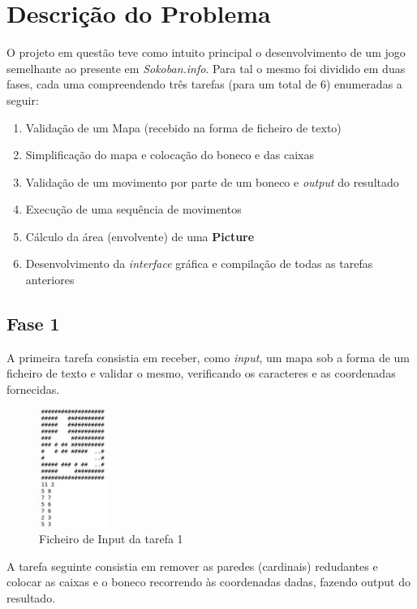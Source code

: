 \documentclass[a4paper]{article}
\begin{document}
\section{Descrição do Problema}
\label{sec:problema}

O projeto em questão teve como intuito principal o desenvolvimento de um jogo semelhante ao presente em \textit{Sokoban.info}. Para tal o mesmo foi dividido em duas fases, cada uma compreendendo três tarefas (para um total de 6) enumeradas a seguir:	 
	\begin{enumerate}
		\item Validação de um Mapa (recebido na forma de ficheiro de texto)
		\item Simplificação do mapa e colocação do boneco e das caixas 
		\item Validação de um movimento por parte de um boneco e \textit{output} do resultado
		\item Execução de uma sequência de movimentos
		\item Cálculo da área (envolvente) de uma \textbf{Picture}
		\item Desenvolvimento da \textit{interface} gráfica e compilação de todas as tarefas anteriores 
	\end{enumerate}

\subsection{Fase 1}
A primeira tarefa consistia em receber, como \textit{input}, um mapa sob a forma de um ficheiro de texto e validar o mesmo, verificando os caracteres e as coordenadas fornecidas.

\begin{figure}[ht]
	\centering
	\includegraphics[width=0.2\textwidth]{Recursos/mapaExemplo.jpg}  
	\caption{Ficheiro de Input da tarefa 1}
\end{figure}


A tarefa seguinte consistia em remover as paredes (cardinais) redudantes e colocar as caixas e o boneco recorrendo às coordenadas dadas, fazendo output do resultado.
\end{document}
